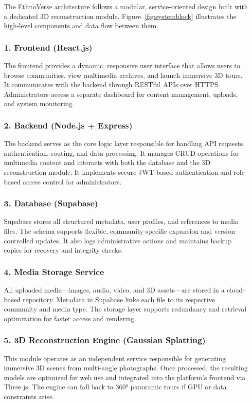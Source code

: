 \noindent
The EthnoVerse architecture follows a modular, service-oriented design built with a dedicated 3D reconstruction module. Figure~\ref{fig:systemblock} illustrates the high-level components and data flow between them.

\subsubsection*{1. Frontend (React.js)}
The frontend provides a dynamic, responsive user interface that allows users to browse communities, view multimedia archives, and launch immersive 3D tours. It communicates with the backend through RESTful APIs over HTTPS. Administrators access a separate dashboard for content management, uploads, and system monitoring.

\subsubsection*{2. Backend (Node.js + Express)}
The backend serves as the core logic layer responsible for handling API requests, authentication, routing, and data processing. It manages CRUD operations for multimedia content and interacts with both the database and the 3D reconstruction module. It implements secure JWT-based authentication and role-based access control for administrators.

\subsubsection*{3. Database (Supabase)}
Supabase stores all structured metadata, user profiles, and references to media files. The schema supports flexible, community-specific expansion and version-controlled updates. It also logs administrative actions and maintains backup copies for recovery and integrity checks.

\subsubsection*{4. Media Storage Service}
All uploaded media—images, audio, video, and 3D assets—are stored in a cloud-based repository. Metadata in Supabase links each file to its respective community and media type. The storage layer supports redundancy and retrieval optimization for faster access and rendering.

\subsubsection*{5. 3D Reconstruction Engine (Gaussian Splatting)}
This module operates as an independent service responsible for generating immersive 3D scenes from multi-angle photographs. Once processed, the resulting models are optimized for web use and integrated into the platform’s frontend via Three.js. The engine can fall back to 360° panoramic tours if GPU or data constraints arise.

